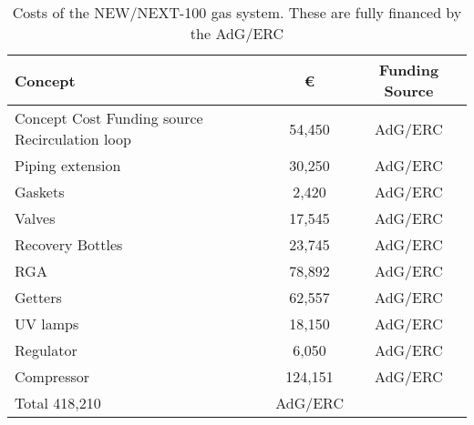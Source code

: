 \begin{table}[h!]
\begin{center}
\begin{tabular}{|l|c|c|}
\hline
 Concept & \euro & Funding Source \\
 \hline		
Concept	Cost	Funding source
 \hline
Recirculation loop	& 54,450 & AdG/ERC \\
Piping extension &	30,250 & AdG/ERC \\
Gaskets & 	2,420 & AdG/ERC \\
Valves	& 17,545 & AdG/ERC \\
Recovery Bottles	& 23,745 & AdG/ERC \\
RGA	& 78,892 & AdG/ERC \\
Getters	& 62,557 & AdG/ERC \\
UV lamps	& 18,150 & AdG/ERC \\
Regulator	& 6,050 & AdG/ERC \\
Compressor &	124,151 & AdG/ERC \\
 \hline
Total 	418,210 & AdG/ERC \\
\hline\hline
\end{tabular}  
\caption{Costs of the NEW/NEXT-100 gas system. These are fully financed by the AdG/ERC}
\label{tab:Gas}
\end{center}
\end{table} 